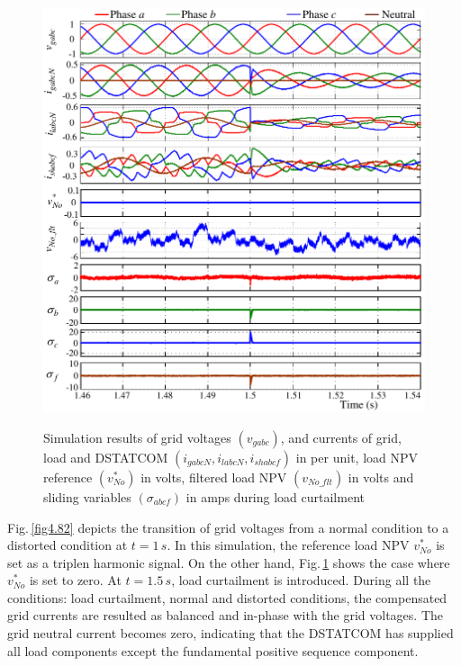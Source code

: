 \begin{figure}[h!] 
		\centering
		\includegraphics[scale=0.9]{figures/Chapter_4/Mine/SimRes2_new.pdf}\\ 
	\caption{Simulation results of grid voltages $(v_{gabc})$, and currents of grid, load and DSTATCOM $(i_{gabcN}, i_{labcN}, i_{shabcf})$ in per unit, load NPV reference $(v^{*}_{No})$ in volts, filtered load NPV $(v_{No\_flt})$ in volts and sliding variables $(\sigma_{abcf})$ in amps during load curtailment} 
	\label{fig4.8}
\end{figure} 

Fig.\,\ref{fig4.82} depicts the transition of grid voltages from a normal condition to a distorted condition at $t=1\,\si{s}$. In this simulation, the reference load NPV $v^{*}_{No}$ is set as a triplen harmonic signal. On the other hand, Fig.\,\ref{fig4.8} shows the case where $v^{*}_{No}$ is set to zero. At $t=1.5\, \si{s}$, load curtailment is introduced. During all the conditions: load curtailment, normal and distorted conditions, the compensated grid currents are resulted as balanced and in-phase with the grid voltages. The grid neutral current becomes zero, indicating that the DSTATCOM has supplied all load components except the fundamental positive sequence component.

